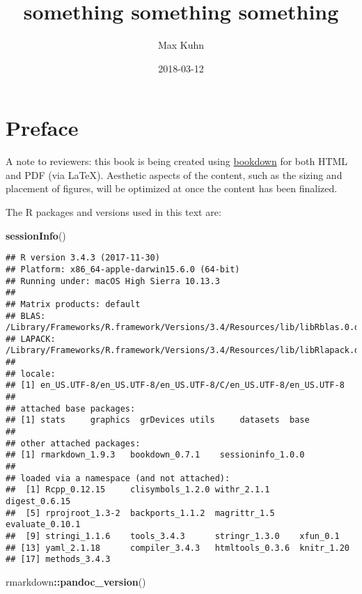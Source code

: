 \documentclass[numberinsequence]{krantz}
\title{something something something}
\author{Max Kuhn}
\date{2018-03-12}
\makeatletter
\newenvironment{Shaded}{\begin{snugshade}}{\end{snugshade}}
\newcommand{\KeywordTok}[1]{\textcolor[rgb]{0.13,0.29,0.53}{\textbf{#1}}}
\newcommand{\NormalTok}[1]{#1}
\newcommand{\OperatorTok}[1]{\textcolor[rgb]{0.81,0.36,0.00}{\textbf{#1}}}
\newenvironment{kframe}{%
\medskip{}
\setlength{\fboxsep}{.8em}
 \def\at@end@of@kframe{}%
 \ifinner\ifhmode%
  \def\at@end@of@kframe{\end{minipage}}%
  \begin{minipage}{\columnwidth}%
 \fi\fi%
 \def\FrameCommand##1{\hskip\@totalleftmargin \hskip-\fboxsep
 \colorbox{shadecolor}{##1}\hskip-\fboxsep
     \hskip-\linewidth \hskip-\@totalleftmargin \hskip\columnwidth}%
 \MakeFramed {\advance\hsize-\width
   \@totalleftmargin\z@ \linewidth\hsize
   \@setminipage}}%
 {\par\unskip\endMakeFramed%
 \at@end@of@kframe}
\renewenvironment{Shaded}{\begin{kframe}}{\end{kframe}}
\makeatother
\begin{document}
\maketitle


\thispagestyle{empty}


\setlength{\abovedisplayskip}{-5pt}
\setlength{\abovedisplayshortskip}{-5pt}

{
\hypersetup{linkcolor=}
\setcounter{tocdepth}{1}
\tableofcontents
}
\hypertarget{preface}{%
\chapter*{Preface}\label{preface}}


A note to reviewers: this book is being created using
\href{https://bookdown.org}{bookdown} for both HTML and PDF (via LaTeX).
Aesthetic aspects of the content, such as the sizing and placement of
figures, will be optimized at once the content has been finalized.

The R packages and versions used in this text are:

\begin{Shaded}
\begin{Highlighting}[]
\KeywordTok{sessionInfo}\NormalTok{()}
\end{Highlighting}
\end{Shaded}

\begin{verbatim}
## R version 3.4.3 (2017-11-30)
## Platform: x86_64-apple-darwin15.6.0 (64-bit)
## Running under: macOS High Sierra 10.13.3
## 
## Matrix products: default
## BLAS: /Library/Frameworks/R.framework/Versions/3.4/Resources/lib/libRblas.0.dylib
## LAPACK: /Library/Frameworks/R.framework/Versions/3.4/Resources/lib/libRlapack.dylib
## 
## locale:
## [1] en_US.UTF-8/en_US.UTF-8/en_US.UTF-8/C/en_US.UTF-8/en_US.UTF-8
## 
## attached base packages:
## [1] stats     graphics  grDevices utils     datasets  base     
## 
## other attached packages:
## [1] rmarkdown_1.9.3   bookdown_0.7.1    sessioninfo_1.0.0
## 
## loaded via a namespace (and not attached):
##  [1] Rcpp_0.12.15     clisymbols_1.2.0 withr_2.1.1      digest_0.6.15   
##  [5] rprojroot_1.3-2  backports_1.1.2  magrittr_1.5     evaluate_0.10.1 
##  [9] stringi_1.1.6    tools_3.4.3      stringr_1.3.0    xfun_0.1        
## [13] yaml_2.1.18      compiler_3.4.3   htmltools_0.3.6  knitr_1.20      
## [17] methods_3.4.3
\end{verbatim}

\begin{Shaded}
\begin{Highlighting}[]
\NormalTok{rmarkdown}\OperatorTok{::}\KeywordTok{pandoc_version}\NormalTok{()}
\end{Highlighting}
\end{Shaded}
\end{document}
